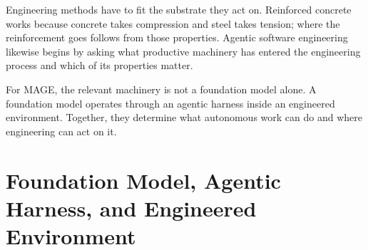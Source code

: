 
Engineering methods have to fit the substrate they act on. Reinforced concrete works because concrete takes compression and steel takes tension; where the reinforcement goes follows from those properties. Agentic software engineering likewise begins by asking what productive machinery has entered the engineering process and which of its properties matter.


For MAGE, the relevant machinery is not a foundation model alone. A foundation model operates through an agentic harness inside an engineered environment. Together, they determine what autonomous work can do and where engineering can act on it.

\section{Foundation Model, Agentic Harness, and Engineered Environment}\label{heading:foundation-model-agentic-harness-and-engineered-environment}

